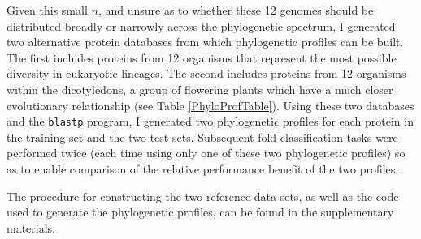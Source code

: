 \documentclass{bioinfo}
\begin{document}
Given this small $n$, and unsure as to whether these 12 genomes should be distributed broadly or narrowly across the phylogenetic spectrum, I generated two alternative protein databases from which phylogenetic profiles can be built.
The first includes proteins from 12 organisms that represent the most possible diversity in eukaryotic lineages.
The second includes proteins from 12 organisms within the dicotyledons, a group of flowering plants which have a much closer evolutionary relationship (see Table \ref{PhyloProfTable}).
Using these two databases and the \texttt{blastp} program, I generated two phylogenetic profiles for each protein in the training set and the two test sets.
Subsequent fold classification tasks were performed twice (each time using only one of these two phylogenetic profiles) so as to enable comparison of the relative performance benefit of the two profiles.

The procedure for constructing the two reference data sets, as well as the code used to generate the phylogenetic profiles, can be found in the supplementary materials.
\end{document}
